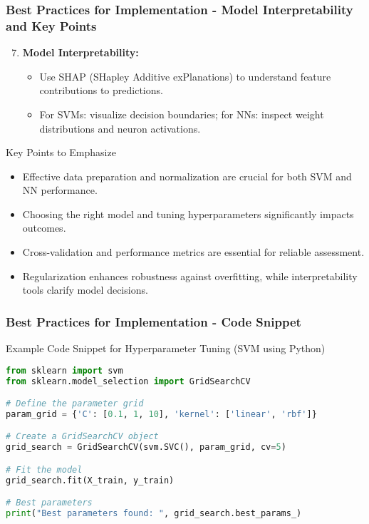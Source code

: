 \documentclass[aspectratio=169]{beamer}
\begin{document}
\begin{frame}[fragile]
    \frametitle{Best Practices for Implementation - Model Interpretability and Key Points}
    \begin{enumerate}
        \setcounter{enumi}{6}
        \item \textbf{Model Interpretability:}
        \begin{itemize}
            \item Use SHAP (SHapley Additive exPlanations) to understand feature contributions to predictions.
            \item For SVMs: visualize decision boundaries; for NNs: inspect weight distributions and neuron activations.
        \end{itemize}
    \end{enumerate}

    \begin{block}{Key Points to Emphasize}
        \begin{itemize}
            \item Effective data preparation and normalization are crucial for both SVM and NN performance.
            \item Choosing the right model and tuning hyperparameters significantly impacts outcomes.
            \item Cross-validation and performance metrics are essential for reliable assessment.
            \item Regularization enhances robustness against overfitting, while interpretability tools clarify model decisions.
        \end{itemize}
    \end{block}
\end{frame}

\begin{frame}[fragile]
    \frametitle{Best Practices for Implementation - Code Snippet}
    \begin{block}{Example Code Snippet for Hyperparameter Tuning (SVM using Python)}
    \begin{lstlisting}[language=Python]
from sklearn import svm
from sklearn.model_selection import GridSearchCV

# Define the parameter grid
param_grid = {'C': [0.1, 1, 10], 'kernel': ['linear', 'rbf']}

# Create a GridSearchCV object
grid_search = GridSearchCV(svm.SVC(), param_grid, cv=5)

# Fit the model
grid_search.fit(X_train, y_train)

# Best parameters
print("Best parameters found: ", grid_search.best_params_)
    \end{lstlisting}
    \end{block}
\end{frame}
\end{document}

